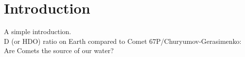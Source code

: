 
\section{Introduction}










A simple introduction.\\

D (or HDO) ratio on Earth compared to Comet 67P/Churyumov-Gerasimenko: Are Comets the source of our water?
